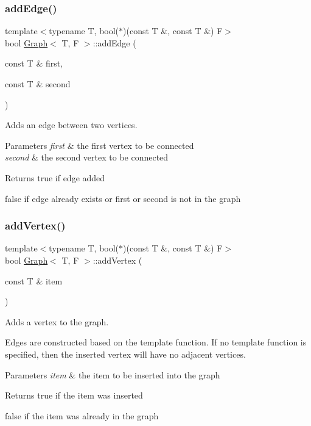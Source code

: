\subsubsection{\texorpdfstring{add\+Edge()}{addEdge()}}
{\footnotesize\ttfamily template$<$typename T, bool($\ast$)(const T \&, const T \&) F$>$ \\
bool \hyperlink{class_graph}{Graph}$<$ T, F $>$\+::add\+Edge (\begin{DoxyParamCaption}\item[{const T \&}]{first,  }\item[{const T \&}]{second }\end{DoxyParamCaption})}



Adds an edge between two vertices. 


\begin{DoxyParams}{Parameters}
{\em first} & the first vertex to be connected \\
\hline
{\em second} & the second vertex to be connected \\
\hline
\end{DoxyParams}
\begin{DoxyReturn}{Returns}
true if edge added 

false if edge already exists or first or second is not in the graph 
\end{DoxyReturn}
\mbox{\label{class_graph_a0d9a2a945cb00f2600f26ad63a4828d6}} 
\subsubsection{\texorpdfstring{add\+Vertex()}{addVertex()}}
{\footnotesize\ttfamily template$<$typename T, bool($\ast$)(const T \&, const T \&) F$>$ \\
bool \hyperlink{class_graph}{Graph}$<$ T, F $>$\+::add\+Vertex (\begin{DoxyParamCaption}\item[{const T \&}]{item }\end{DoxyParamCaption})}



Adds a vertex to the graph. 

Edges are constructed based on the template function. If no template function is specified, then the inserted vertex will have no adjacent vertices.


\begin{DoxyParams}{Parameters}
{\em item} & the item to be inserted into the graph \\
\hline
\end{DoxyParams}
\begin{DoxyReturn}{Returns}
true if the item was inserted 

false if the item was already in the graph 
\end{DoxyReturn}
\mbox{\label{class_graph_adb8fbcba5e10315bba9e60080d4bac50}} 
